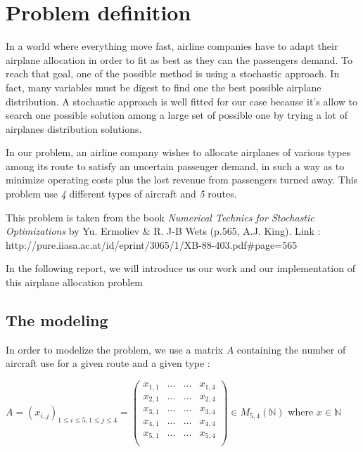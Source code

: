 \documentclass[11pt]{article}
\begin{document}
    \hypertarget{problem-definition}{%
\section{Problem definition}\label{problem-definition}}

In a world where everything move fast, airline companies have to adapt
their airplane allocation in order to fit as best as they can the
passengers demand. To reach that goal, one of the possible method is
using a stochastic approach. In fact, many variables must be digest to
find one the best possible airplane distribution. A stochastic approach
is well fitted for our case because it's allow to search one possible
solution among a large set of possible one by trying a lot of airplanes
distribution solutions.

In our problem, an airline company wishes to allocate airplanes of
various types among its route to satisfy an uncertain passenger demand,
in such a way as to minimize operating costs plus the lost revenue from
passengers turned away. This problem use \emph{4} different types of
aircraft and \emph{5} routes.

This problem is taken from the book \emph{Numerical Technics for
Stochastic Optimizations} by Yu. Ermoliev \& R. J-B Wets (p.565, A.J.
King). Link :  http://pure.iiasa.ac.at/id/eprint/3065/1/XB-88-403.pdf\#page=565

    In the following report, we will introduce us our work and our
implementation of this airplane allocation problem

    \hypertarget{the-modeling}{%
\subsection{The modeling}\label{the-modeling}}

In order to modelize the problem, we use a matrix \(A\) containing the
number of aircraft use for a given route and a given type :

\begin{center}
\(A = (x_{i,j})_{1\leq i\leq 5, 1\leq j\leq 4} = \left( \begin{array}{cccc} x_{1,1} & \ldots & \ldots & x_{1,4} \\ x_{2,1} & \ldots & \ldots & x_{2,4} \\ x_{3,1} & \ldots & \ldots & x_{3,4} \\ x_{4,1} & \ldots & \ldots & x_{4,4} \\ x_{5,1} & \ldots & \ldots & x_{5,4} \\ \end{array} \right) \in M_{5,4}(\mathbb{N})\)
where \(x \in \mathbb{N}\)
\end{center}
\end{document}

